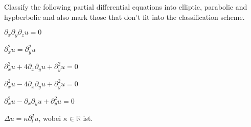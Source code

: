 Classify the following partial differential equations into elliptic,
parabolic and hypberbolic and also mark those that don't fit into
the classification scheme.
\begin{teilaufgaben}
\item $\partial_x\partial_y\partial_z u=0$
\item $\partial_x^2u=\partial_y^2u$
\item $\partial_x^2u+4\partial_x\partial_yu+\partial_y^2u=0$
\item $\partial_x^2u-4\partial_x\partial_yu+\partial_y^2u=0$
\item $\partial_x^2u-\partial_x\partial_yu+\partial_y^2u=0$
\item $\Delta u=\kappa\partial_t^2u$, wobei $\kappa\in \mathbb R$ ist.
\end{teilaufgaben}

